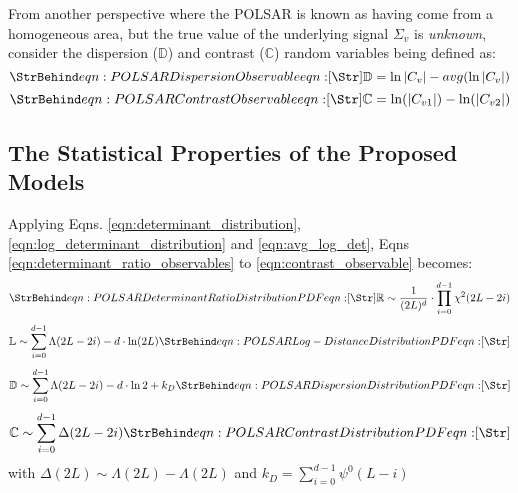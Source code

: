 From another perspective where the POLSAR is known as having come from a homogeneous area, but the true value of the underlying signal $\Sigma_v$ is \textit{unknown}, consider the dispersion ($\mathbb{D}$) and contrast ($\mathbb{C}$) random variables being defined as:
\begin{equation}
 \label{eqn:dispersion_observable}
 \caption{eqn:POLSAR Dispersion Observable}
 \mathbb{D} = \ln{|C_v|} - avg(\ln{|C_v|})  
\end{equation}
\begin{equation}
  \label{eqn:contrast_observable}
  \caption{eqn:POLSAR Contrast Observable}
  \mathbb{C} = \ln(|C_{v1}|) - \ln(|C_{v2}|)
\end{equation}

\subsection{The Statistical Properties of the Proposed Models}

Applying Eqns. \ref{eqn:determinant_distribution}, \ref{eqn:log_determinant_distribution} and \ref{eqn:avg_log_det}, Eqns \ref{eqn:determinant_ratio_observables} to \ref{eqn:contrast_observable} becomes:
\begin{equation}
 \label{eqn:determinant_ratio_distribution}
 \caption{eqn:POLSAR Determinant Ratio Distribution PDF}
 \mathbb{R} \sim \frac{1}{(2L)^d} \cdot \prod_{i=0}^{d-1} \chi^2 (2L-2i) 
\end{equation}
\begin{equation}
\mathbb{L} \sim  \sum^{d-1}_{i=0} \Lambda(2L-2i) - d \cdot \ln(2L)
\label{eqn:log_determinant_distance_distribution}  
 \caption{eqn:POLSAR Log-Distance Distribution PDF}
\end{equation}
\begin{equation}
 \mathbb{D} \sim \sum^{d-1}_{i=0} \Lambda(2L-2i) - d \cdot \ln{2} + k_D
\label{eqn:dispersion_distribution}  
 \caption{eqn:POLSAR Dispersion Distribution PDF}
\end{equation}
\begin{equation}
 \mathbb{C} \sim \sum^{d-1}_{i=0} \Delta(2L-2i)
\label{eqn:contrast_distribution}  
 \caption{eqn:POLSAR Contrast Distribution PDF}
\end{equation}
with $\Delta(2L) \sim \Lambda(2L) - \Lambda(2L)$
and $k_D=\sum^{d-1}_{i=0} \psi^0(L-i)$

